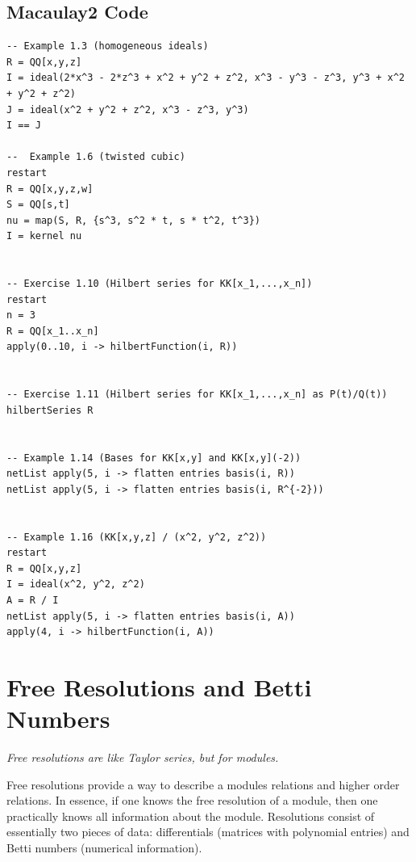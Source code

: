 \documentclass[12pt,a4paper]{article}
\theoremstyle{definition}
\numberwithin{equation}{section}
\begin{document}
\subsection{Macaulay2 Code}
\begin{verbatim}
-- Example 1.3 (homogeneous ideals)
R = QQ[x,y,z]
I = ideal(2*x^3 - 2*z^3 + x^2 + y^2 + z^2, x^3 - y^3 - z^3, y^3 + x^2 + y^2 + z^2)
J = ideal(x^2 + y^2 + z^2, x^3 - z^3, y^3)
I == J

--  Example 1.6 (twisted cubic)
restart
R = QQ[x,y,z,w]
S = QQ[s,t]
nu = map(S, R, {s^3, s^2 * t, s * t^2, t^3})
I = kernel nu


-- Exercise 1.10 (Hilbert series for KK[x_1,...,x_n])
restart
n = 3
R = QQ[x_1..x_n]
apply(0..10, i -> hilbertFunction(i, R))


-- Exercise 1.11 (Hilbert series for KK[x_1,...,x_n] as P(t)/Q(t))
hilbertSeries R


-- Example 1.14 (Bases for KK[x,y] and KK[x,y](-2))
netList apply(5, i -> flatten entries basis(i, R))
netList apply(5, i -> flatten entries basis(i, R^{-2}))


-- Example 1.16 (KK[x,y,z] / (x^2, y^2, z^2))
restart
R = QQ[x,y,z]
I = ideal(x^2, y^2, z^2)
A = R / I
netList apply(5, i -> flatten entries basis(i, A))
apply(4, i -> hilbertFunction(i, A))
\end{verbatim}





\newpage
\section{Free Resolutions and Betti Numbers}
\textit{Free resolutions are like Taylor series, but for modules.}

\vspace*{2.5cm}

Free resolutions provide a way to describe a modules relations and higher order relations.
In essence, if one knows the free resolution of a module, then one practically knows all information about the module.
Resolutions consist of essentially two pieces of data: differentials (matrices with polynomial entries) and Betti numbers (numerical information).

\vspace*{2.5cm}
\end{document}
